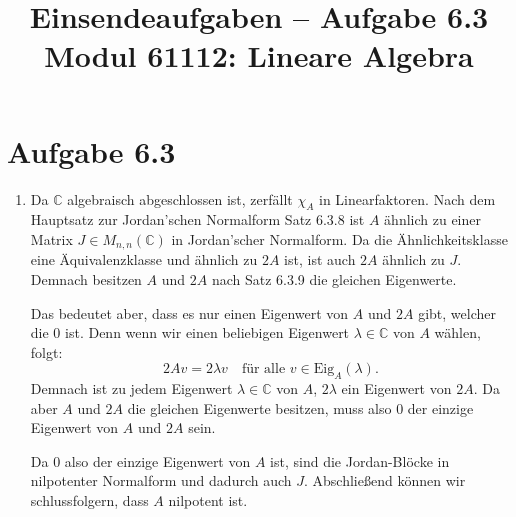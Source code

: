 \documentclass[a4paper,12pt]{article}
\title{Einsendeaufgaben -- Aufgabe 6.3\\[0.5em]
\large Modul 61112: Lineare Algebra}
\author{}
\date{}
\begin{document}
\maketitle

\section*{Aufgabe 6.3}

\begin{enumerate}[label=\alph*)]
  \item Da $\mathbb{C}$ algebraisch abgeschlossen ist, zerfällt $\chi_A$ in
  Linearfaktoren. Nach dem Hauptsatz zur Jordan'schen Normalform Satz 6.3.8
  ist $A$ ähnlich zu einer Matrix $J \in M_{n,n}(\mathbb{C})$ in Jordan'scher
  Normalform. Da die Ähnlichkeitsklasse eine Äquivalenzklasse und ähnlich zu
  $2A$ ist, ist auch $2A$ ähnlich zu $J$. Demnach besitzen $A$ und $2A$ nach
  Satz 6.3.9 die gleichen Eigenwerte.

  Das bedeutet aber, dass es nur einen Eigenwert von $A$ und $2A$ gibt, welcher
  die $0$ ist. Denn wenn wir einen beliebigen Eigenwert $\lambda \in \mathbb{C}$
  von $A$ wählen, folgt:
  \[
    2Av = 2\lambda v \quad \text{für alle } v \in \mathrm{Eig}_A(\lambda).
  \]
  Demnach ist zu jedem Eigenwert $\lambda \in \mathbb{C}$ von $A$, $2\lambda$ ein
  Eigenwert von $2A$. Da aber $A$ und $2A$ die gleichen Eigenwerte besitzen, muss
  also $0$ der einzige Eigenwert von $A$ und $2A$ sein.

  Da $0$ also der einzige Eigenwert von $A$ ist, sind die Jordan-Blöcke in
  nilpotenter Normalform und dadurch auch $J$. Abschließend können wir
  schlussfolgern, dass $A$ nilpotent ist.
\end{enumerate}
\end{document}
